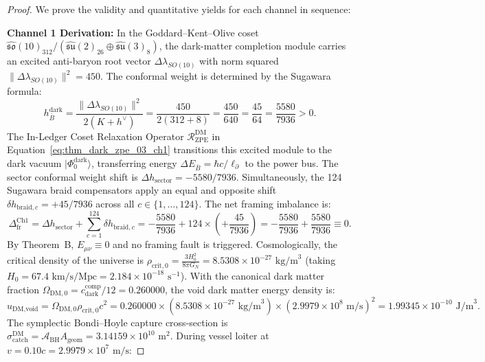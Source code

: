 \documentclass[11pt,onecolumn]{article}
\begin{document}
\begin{proof}
We prove the validity and quantitative yields for each channel in sequence:

\textbf{Channel 1 Derivation:} In the Goddard--Kent--Olive coset $\hat{\mathfrak{so}}(10)_{312} / (\hat{\mathfrak{su}}(2)_{26} \oplus \hat{\mathfrak{su}}(3)_8)$, the dark-matter completion module carries an excited anti-baryon root vector $\Delta\lambda_{SO(10)}$ with norm squared $\|\Delta\lambda_{SO(10)}\|^2 = 450$. The conformal weight is determined by the Sugawara formula:
\begin{equation}
h_{\bar{B}}^{\text{dark}} = \frac{\|\Delta\lambda_{SO(10)}\|^2}{2(K + h^\vee)} = \frac{450}{2(312 + 8)} = \frac{450}{640} = \frac{45}{64} = \frac{5580}{7936} > 0.
\end{equation}
The In-Ledger Coset Relaxation Operator $\mathcal{R}_{\text{ZPE}}^{\text{DM}}$ in Equation~\eqref{eq:thm_dark_zpe_03_ch1} transitions this excited module to the dark vacuum $|\Phi_0^{\text{dark}}\rangle$, transferring energy $\Delta E_{\bar{B}} = \hbar c / \ell_\partial$ to the power bus. The sector conformal weight shift is $\Delta h_{\text{sector}} = -5580/7936$. Simultaneously, the 124 Sugawara braid compensators apply an equal and opposite shift $\delta h_{\text{braid}, c} = +45/7936$ across all $c \in \{1, \dots, 124\}$. The net framing imbalance is:
\begin{equation}
\Delta_{\text{fr}}^{\text{Ch1}} = \Delta h_{\text{sector}} + \sum_{c=1}^{124} \delta h_{\text{braid}, c} = -\frac{5580}{7936} + 124 \times \left(+\frac{45}{7936}\right) = -\frac{5580}{7936} + \frac{5580}{7936} \equiv 0.
\end{equation}
By Theorem~B, $E_{\mu\nu} \equiv 0$ and no framing fault is triggered. Cosmologically, the critical density of the universe is $\rho_{\text{crit},0} = \frac{3H_0^2}{8\pi G_N} = 8.5308 \times 10^{-27}\text{ kg/m}^3$ (taking $H_0 = 67.4\text{ km/s/Mpc} = 2.184 \times 10^{-18}\text{ s}^{-1}$). With the canonical dark matter fraction $\Omega_{\text{DM},0} = c_{\text{dark}}^{\text{comp}}/12 = 0.260000$, the void dark matter energy density is:
\begin{equation}
u_{\text{DM,void}} = \Omega_{\text{DM},0} \rho_{\text{crit},0} c^2 = 0.260000 \times (8.5308 \times 10^{-27}\text{ kg/m}^3) \times (2.9979 \times 10^8\text{ m/s})^2 = 1.99345 \times 10^{-10}\text{ J/m}^3.
\end{equation}
The symplectic Bondi--Hoyle capture cross-section is $\sigma_{\text{catch}}^{\text{DM}} = \mathcal{A}_{\text{BH}} A_{\text{geom}} = 3.14159 \times 10^{10}\text{ m}^2$. During vessel loiter at $v = 0.10c = 2.9979 \times 10^7\text{ m/s}$:

\end{proof}
\end{document}
